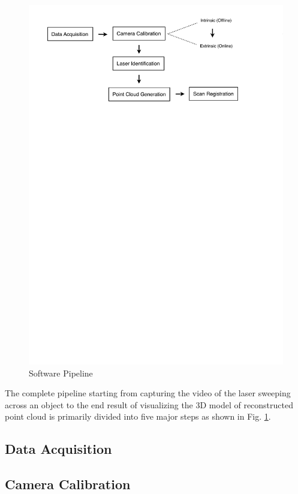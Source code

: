\begin{figure}[ht!]
\centering
\includegraphics[width=1.0\linewidth]{figures/pipeline}
\caption{Software Pipeline}
\label{figure:pipeline}
\end{figure}

The complete pipeline starting from capturing the video of the laser sweeping
across an object to the end result of visualizing the 3D model of
reconstructed point cloud is primarily divided into five major steps as shown
in Fig. \ref{figure:pipeline}.
\subsection{Data Acquisition}
\label{subsection:data-acquistion}


\subsection{Camera Calibration}
\label{subsection:camera-calibration}


